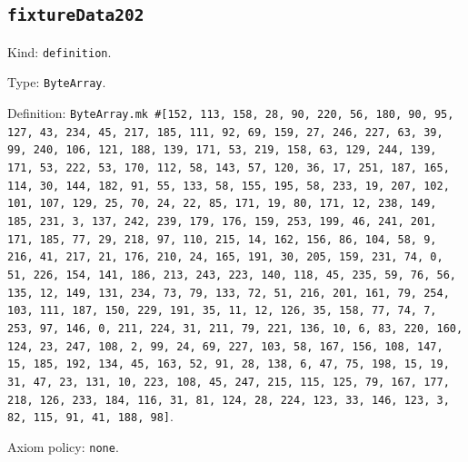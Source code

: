 \documentclass[11pt]{article}
\begin{document}
\subsection*{\texttt{fixtureData202}}
\noindent Kind: \texttt{definition}.\par
\noindent Type: \texttt{ByteArray}.\par
\noindent Definition: \texttt{ByteArray.mk \#[152, 113, 158, 28, 90, 220, 56, 180, 90, 95, 127, 43, 234, 45, 217, 185, 111, 92, 69, 159, 27, 246, 227, 63, 39, 99, 240, 106, 121, 188, 139, 171, 53, 219, 158, 63, 129, 244, 139, 171, 53, 222, 53, 170, 112, 58, 143, 57, 120, 36, 17, 251, 187, 165, 114, 30, 144, 182, 91, 55, 133, 58, 155, 195, 58, 233, 19, 207, 102, 101, 107, 129, 25, 70, 24, 22, 85, 171, 19, 80, 171, 12, 238, 149, 185, 231, 3, 137, 242, 239, 179, 176, 159, 253, 199, 46, 241, 201, 171, 185, 77, 29, 218, 97, 110, 215, 14, 162, 156, 86, 104, 58, 9, 216, 41, 217, 21, 176, 210, 24, 165, 191, 30, 205, 159, 231, 74, 0, 51, 226, 154, 141, 186, 213, 243, 223, 140, 118, 45, 235, 59, 76, 56, 135, 12, 149, 131, 234, 73, 79, 133, 72, 51, 216, 201, 161, 79, 254, 103, 111, 187, 150, 229, 191, 35, 11, 12, 126, 35, 158, 77, 74, 7, 253, 97, 146, 0, 211, 224, 31, 211, 79, 221, 136, 10, 6, 83, 220, 160, 124, 23, 247, 108, 2, 99, 24, 69, 227, 103, 58, 167, 156, 108, 147, 15, 185, 192, 134, 45, 163, 52, 91, 28, 138, 6, 47, 75, 198, 15, 19, 31, 47, 23, 131, 10, 223, 108, 45, 247, 215, 115, 125, 79, 167, 177, 218, 126, 233, 184, 116, 31, 81, 124, 28, 224, 123, 33, 146, 123, 3, 82, 115, 91, 41, 188, 98]}.\par
\noindent Axiom policy: \texttt{none}.\par
\end{document}
